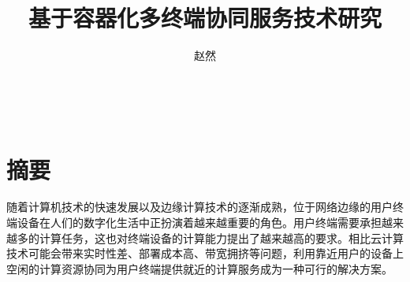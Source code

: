 \confidential{}%
\title{基于容器化多终端协同服务技术研究}%
\author{赵然}%
\maketitle%
\MAKETITLE%
\makedeclaration%
\chapter*{摘\quad 要}%
\setcounter{page}{1}%

随着计算机技术的快速发展以及边缘计算技术的逐渐成熟，位于网络边缘的用户终端设备在人们的数字化生活中正扮演着越来越重要的角色。用户终端需要承担越来越多的计算任务，这也对终端设备的计算能力提出了越来越高的要求。相比云计算技术可能会带来实时性差、部署成本高、带宽拥挤等问题，利用靠近用户的设备上空闲的计算资源协同为用户终端提供就近的计算服务成为一种可行的解决方案。


